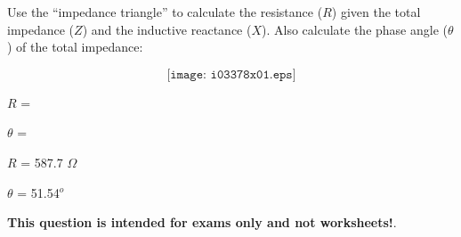 

Use the ``impedance triangle'' to calculate the resistance ($R$) given the total impedance ($Z$) and the inductive reactance ($X$).  Also calculate the phase angle ($\theta$) of the total impedance:

$$\texttt{[image: i03378x01.eps]}$$

\vskip 20pt

$R$ = 

\vskip 10pt

$\theta$ = 







$R$ = 587.7 $\Omega$

\vskip 10pt

$\theta$ = 51.54$^{o}$







{\bf This question is intended for exams only and not worksheets!}.



